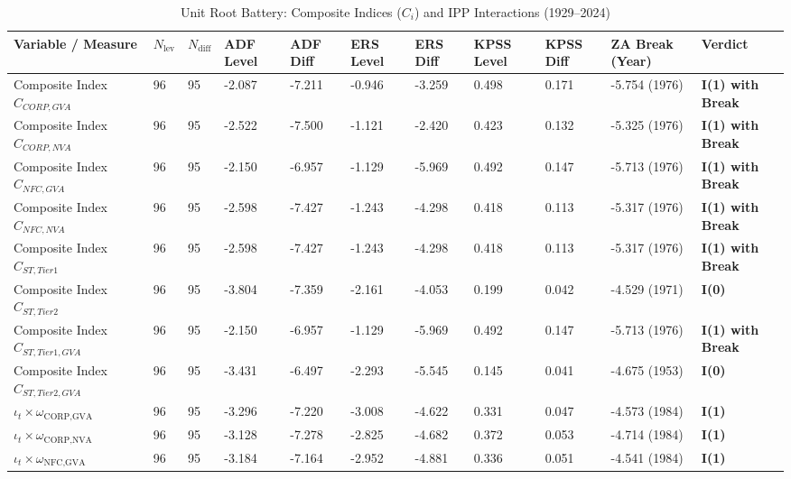 \begin{table}[H]
\centering
\scriptsize
\caption{Unit Root Battery: Composite Indices ($C_i$) and IPP Interactions (1929--2024)}
\label{tab:urca_composite}
\begin{tabular}{p{5.5cm} p{0.5cm} p{0.5cm} p{1.3cm} p{1.3cm} p{1.3cm} p{1.3cm} p{1.3cm} p{1.3cm} p{2.2cm} p{2.2cm}}
\toprule
\textbf{Variable / Measure} & \textbf{$N_{\text{lev}}$} & \textbf{$N_{\text{diff}}$} & \textbf{ADF Level} & \textbf{ADF Diff} & \textbf{ERS Level} & \textbf{ERS Diff} & \textbf{KPSS Level} & \textbf{KPSS Diff} & \textbf{ZA Break (Year)} & \textbf{Verdict} \\
\midrule
Composite Index $C_{CORP,GVA}$ & 96 & 95 & -2.087 & -7.211 & -0.946 & -3.259 & 0.498 & 0.171 & -5.754 (1976) & \textbf{I(1) with Break} \\ 
Composite Index $C_{CORP,NVA}$ & 96 & 95 & -2.522 & -7.500 & -1.121 & -2.420 & 0.423 & 0.132 & -5.325 (1976) & \textbf{I(1) with Break} \\ 
Composite Index $C_{NFC,GVA}$ & 96 & 95 & -2.150 & -6.957 & -1.129 & -5.969 & 0.492 & 0.147 & -5.713 (1976) & \textbf{I(1) with Break} \\ 
Composite Index $C_{NFC,NVA}$ & 96 & 95 & -2.598 & -7.427 & -1.243 & -4.298 & 0.418 & 0.113 & -5.317 (1976) & \textbf{I(1) with Break} \\ 
Composite Index $C_{ST,Tier1}$ & 96 & 95 & -2.598 & -7.427 & -1.243 & -4.298 & 0.418 & 0.113 & -5.317 (1976) & \textbf{I(1) with Break} \\ 
Composite Index $C_{ST,Tier2}$ & 96 & 95 & -3.804 & -7.359 & -2.161 & -4.053 & 0.199 & 0.042 & -4.529 (1971) & \textbf{I(0)} \\ 
Composite Index $C_{ST,Tier1,GVA}$ & 96 & 95 & -2.150 & -6.957 & -1.129 & -5.969 & 0.492 & 0.147 & -5.713 (1976) & \textbf{I(1) with Break} \\ 
Composite Index $C_{ST,Tier2,GVA}$ & 96 & 95 & -3.431 & -6.497 & -2.293 & -5.545 & 0.145 & 0.041 & -4.675 (1953) & \textbf{I(0)} \\ 
$\iota_t \times \omega_{\text{CORP,GVA}}$ & 96 & 95 & -3.296 & -7.220 & -3.008 & -4.622 & 0.331 & 0.047 & -4.573 (1984) & \textbf{I(1)} \\ 
$\iota_t \times \omega_{\text{CORP,NVA}}$ & 96 & 95 & -3.128 & -7.278 & -2.825 & -4.682 & 0.372 & 0.053 & -4.714 (1984) & \textbf{I(1)} \\ 
$\iota_t \times \omega_{\text{NFC,GVA}}$ & 96 & 95 & -3.184 & -7.164 & -2.952 & -4.881 & 0.336 & 0.051 & -4.541 (1984) & \textbf{I(1)} \\ 

\end{tabular}
\end{table}
